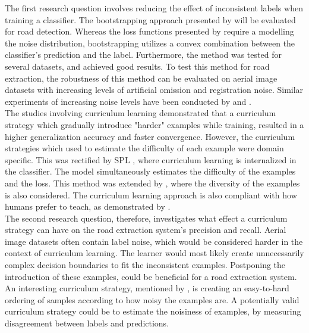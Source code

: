 The first research question involves reducing the effect of inconsistent labels when training a classifier. The bootstrapping approach presented by \cite{Reed_noisy_labels_bootstrapping} will be evaluated for road detection. Whereas the loss functions presented by \citep{Mnih_aerial_images_noisy} require a modelling the noise distribution,  bootstrapping utilizes a convex combination between the classifier's prediction and the label. Furthermore, the method was tested for several datasets, and achieved good results. To test this method for road extraction, the robustness of this method can be evaluated on aerial image datasets with increasing levels of artificial omission and registration noise. Similar experiments of increasing noise levels have been conducted by \citep{Sukhbaatar_noisy_network_learning} and \citep{Reed_noisy_labels_bootstrapping}.\\

The studies involving curriculum learning demonstrated that a curriculum strategy which gradually introduce "harder" examples while training, resulted in a higher generalization accuracy and faster convergence. However, the curriculum strategies which \cite{Bengio_curriculumlearning} used to estimate the difficulty of each example were domain specific. This was rectified by \ac{SPL} \citep{Kumar_self_paced_learning}, where curriculum learning is internalized in the classifier. The model simultaneously estimates the difficulty of the examples and the loss. This method was extended by \citep{Lu_self-paced_learning_diversity}, where the diversity of the examples is  also considered. The curriculum learning approach is also compliant with how humans prefer to teach, as demonstrated by \cite{Khan_human_teach}.\\

The second research question, therefore, investigates what effect a curriculum strategy can have on the road extraction system's precision and recall. Aerial image datasets often contain label noise, which would be considered harder in the context of curriculum learning. The learner would most likely create unnecessarily complex decision boundaries to fit the inconsistent examples. Postponing the introduction of these examples, could be beneficial for a road extraction system. An interesting curriculum strategy, mentioned by \cite{Bengio_curriculumlearning}, is creating an easy-to-hard ordering of samples according to how noisy the examples are. A potentially valid curriculum strategy could be to estimate the noisiness of examples, by measuring disagreement between labels and predictions.\\